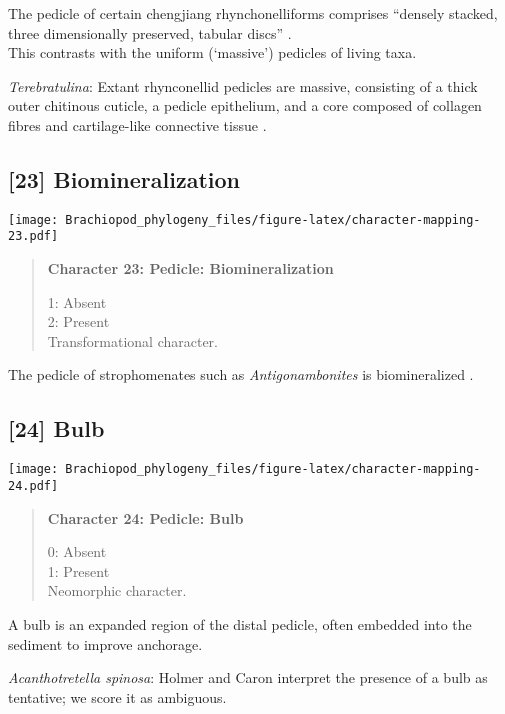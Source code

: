 \documentclass[openany]{book}
\theoremstyle{definition}
\theoremstyle{definition}
\theoremstyle{definition}
\theoremstyle{remark}
\begin{document}
The pedicle of certain chengjiang rhynchonelliforms comprises ``densely
stacked, three dimensionally preserved, tabular discs''
\citep{Holmer2018Evolutionarysignificance}.\\
This contrasts with the uniform (`massive') pedicles of living taxa.

\hypertarget{Terebratulina-coding-22}{}
\emph{Terebratulina}: Extant rhynconellid pedicles are massive,
consisting of a thick outer chitinous cuticle, a pedicle epithelium, and
a core composed of collagen fibres and cartilage-like connective tissue
\citep{Holmer2018Evolutionarysignificance}.

\subsection*{{[}23{]} Biomineralization}\label{biomineralization}

\texttt{[image: Brachiopod\_phylogeny\_files/figure-latex/character-mapping-23.pdf]}

\begin{quote}
\textbf{Character 23: Pedicle: Biomineralization}

1: Absent\\
2: Present\\
Transformational character.
\end{quote}

The pedicle of strophomenates such as \emph{Antigonambonites} is
biomineralized \citep{Holmer2018Evolutionarysignificance}.

\subsection*{{[}24{]} Bulb}\label{bulb}

\texttt{[image: Brachiopod\_phylogeny\_files/figure-latex/character-mapping-24.pdf]}

\begin{quote}
\textbf{Character 24: Pedicle: Bulb}

0: Absent\\
1: Present\\
Neomorphic character.
\end{quote}

A bulb is an expanded region of the distal pedicle, often embedded into
the sediment to improve anchorage.

\hypertarget{Acanthotretella_spinosa-coding-24}{}
\emph{Acanthotretella spinosa}: Holmer and Caron
\citeyearpar{Holmer2006Aspinose} interpret the presence of a bulb as
tentative; we score it as ambiguous.
\end{document}
